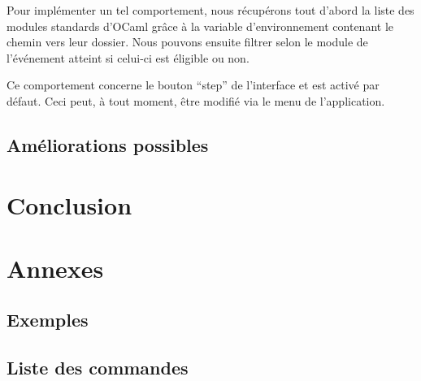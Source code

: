 \documentclass[11pt,a4paper]{report}
\begin{document}
Pour implémenter un tel comportement, nous récupérons tout d'abord la liste des modules standards
d'OCaml grâce à la variable d'environnement contenant le chemin vers leur dossier. Nous pouvons ensuite
filtrer selon le module de l'événement atteint si celui-ci est éligible ou non.

Ce comportement concerne le bouton ``step'' de l'interface et est activé par défaut. 
Ceci peut, à tout moment, être modifié via le menu de l'application.

\section{Améliorations possibles}

\chapter{Conclusion}


\chapter{Annexes}

\section{Exemples}
\section{Liste des commandes}
\end{document}
